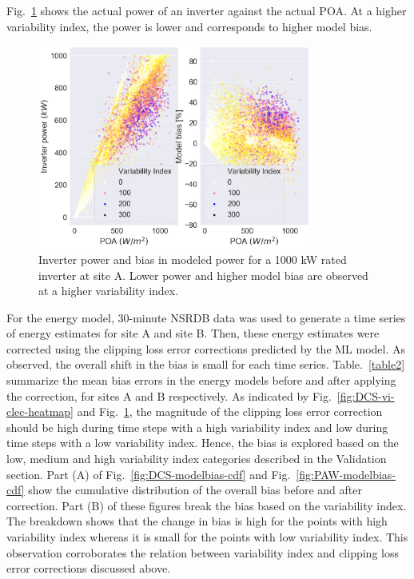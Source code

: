 \documentclass[conference]{IEEEtran}
\begin{document}
Fig.~\ref{fig:DCS-inv-modelbias-poa-scatter} shows the actual power of an inverter against the actual POA. At a higher variability index, the power is lower and corresponds to higher model bias.

\begin{figure}[htbp]
\centerline{\includegraphics[width=9cm]{DCS_Inv_ModelBias_POA_with_VI.png}}
\caption{Inverter power and bias in modeled power for a 1000 kW rated inverter at site A. Lower power and higher model bias are observed at a higher variability index.}
\label{fig:DCS-inv-modelbias-poa-scatter}
\end{figure}

For the energy model, 30-minute NSRDB data was used to generate a time series of energy estimates for site A and site B. Then, these energy estimates were corrected using the clipping loss error corrections predicted by the ML model. As observed, the overall shift in the bias is small for each time series. Table.~\ref{table2} summarize the mean bias errors in the energy models before and after applying the correction, for sites A and B respectively. As indicated by Fig.~\ref{fig:DCS-vi-clec-heatmap} and Fig.~\ref{fig:DCS-inv-modelbias-poa-scatter}, the magnitude of the clipping loss error correction should be high during time steps with a high variability index and low during time steps with a low variability index. Hence, the bias is explored based on the low, medium and high variability index categories described in the Validation section. Part (A) of Fig.~\ref{fig:DCS-modelbias-cdf} and Fig.~\ref{fig:PAW-modelbias-cdf} show the cumulative distribution of the overall bias before and after correction. Part (B) of these figures break the bias based on the variability index. The breakdown shows that the change in bias is high for the points with high variability index whereas it is small for the points with low variability index. This observation corroborates the relation between variability index and clipping loss error corrections discussed above.
\end{document}
